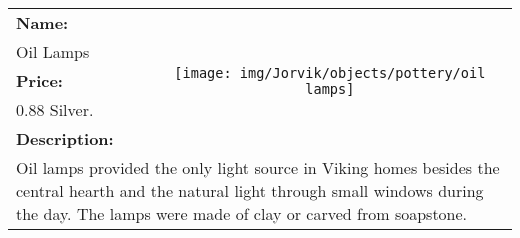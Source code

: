 \begin{table}[ht!]
	\centering
	\begin{tabular}{ p{3cm} c }\toprule
		\textbf{Name:} & \multirow{5}{*}{\texttt{[image: img/Jorvik/objects/pottery/oil lamps]}}\\
		Oil Lamps & \\ 
		\textbf{Price:} & \\
		0.88 Silver. & \\ 
		\textbf{Description:} & \\
		\multicolumn{2}{p{12cm}}{Oil lamps provided the only light source in Viking homes besides the central hearth and the natural light through small windows during the day. The lamps were made of clay or carved from soapstone.}\\
		\bottomrule
	\end{tabular}
\end{table}